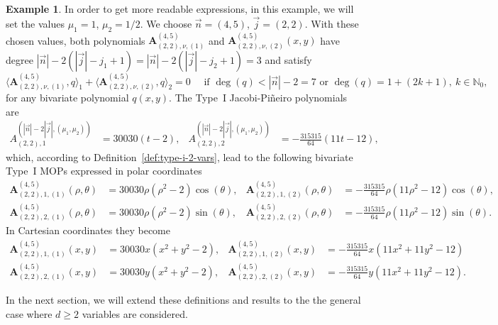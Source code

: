 \documentclass[a4paper]{article}
\theoremstyle{plain}
\theoremstyle{definition}
\newtheorem{example}[theorem]{Example}
\begin{document}
    \begin{example}
        In order to get more readable expressions, in this example, we will set the values  $\mu_1=1$, $\mu_2 = 1/2$. We choose $\vec n = (4,5)$, $\vec j =(2,2)$. With these chosen values, both polynomials $\mathbf A_{(2,2),\nu,(1)}^{(4,5)}$ and $\mathbf A_{(2,2),\nu,(2)}^{(4,5)}(x,y)$ have degree $|\vec n|-2(|\vec j|-j_1+1)=|\vec n|-2(|\vec j|-j_2+1)=3$ and satisfy
        $$
        \langle \mathbf A_{(2,2),\nu,(1)}^{(4,5)}, q\rangle_1 + 
        \langle \mathbf A_{(2,2),\nu,(2)}^{(4,5)}, q\rangle_2 =0 \quad\text{ if } \deg(q)<|\vec n|-2 = 7 \text{ or } \deg(q)=1+(2k+1),\ k\in\mathbb N_0,
        $$
        for any bivariate polynomial $q(x,y)$. The Type~I Jacobi-Pi\~neiro polynomials are
        \begin{align*}
            A^{(|\vec n|-2|\vec j|,(\mu_1,\mu_2))}_{(2,2),1} &= 30030 (t-2),& 
            A^{(|\vec n|-2|\vec j|,(\mu_1,\mu_2))}_{(2,2),2} &=-\frac{315315}{64} (11 t-12),
        \end{align*}
        which, according to Definition~\ref{def:type-i-2-vars}, lead to the following bivariate Type~I MOPs expressed in polar coordinates
        \begin{align*}
            \mathbf A_{(2,2),1,(1)}^{(4,5)}(\rho,\theta)&=30030 \rho  \left(\rho ^2-2\right) \cos (\theta ),& \mathbf A_{(2,2),1,(2)}^{(4,5)}(\rho,\theta)&=- \frac{315315}{64}\rho  \left(11 \rho ^2-12\right) \cos (\theta ),\\
            \mathbf A_{(2,2),2,(1)}^{(4,5)}(\rho,\theta)&=30030 \rho  \left(\rho ^2-2\right) \sin (\theta ),& \mathbf A_{(2,2),2,(2)}^{(4,5)}(\rho,\theta)&=- \frac{315315}{64}\rho  \left(11 \rho ^2-12\right) \sin (\theta ).
        \end{align*}
        In Cartesian coordinates they become
        \begin{align*}
            \mathbf A_{(2,2),1,(1)}^{(4,5)}(x,y)&=30030 x \left(x^2+y^2-2\right),& \mathbf A_{(2,2),1,(2)}^{(4,5)}(x,y)&=-\frac{315315}{64}  x \left(11 x^2+11 y^2-12\right)\\
            \mathbf A_{(2,2),2,(1)}^{(4,5)}(x,y)&=30030 y \left(x^2+y^2-2\right),& \mathbf A_{(2,2),2,(2)}^{(4,5)}(x,y)&=-\frac{315315}{64} y \left(11 x^2+11 y^2-12\right).
        \end{align*}
        
    \end{example}
    
    In the next section, we will extend these definitions and results to the the general case where $d\geq 2$ variables are considered.
\end{document}
